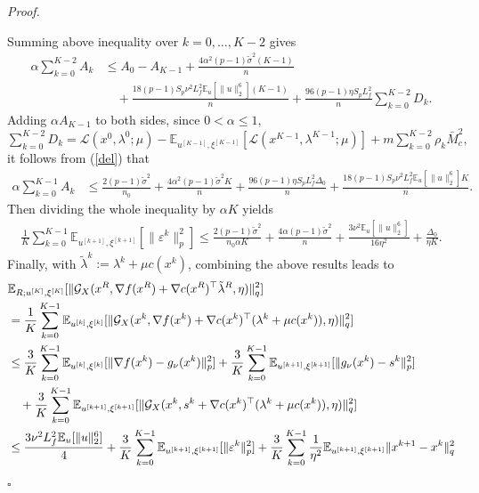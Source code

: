 \documentclass[11pt]{article}
\newenvironment{proof}[1][Proof]{%
    \par\noindent\textit{#1.}\enspace
  }{%
    \hfill\ensuremath{\square}\par
  }%
\numberwithin{equation}{section}
\newcommand{\E}{\mathbb{E}}
\newcommand{\be}{\begin{equation}}
\newcommand{\ee}{\end{equation}}
\begin{document}
\begin{proof}
\[     \]
     Summing above inequality over \(k=0,\ldots,K-2\) gives
     \begin{align*}
     \alpha\sum_{k=0}^{K-2}A_k
     &\leq A_0-A_{K-1}
     +\frac{4\alpha^2(p-1)\tilde\sigma^2(K-1)}{n}\\
     &\quad
     +\frac{18(p-1)S_p\nu^2L_f^2\E_u[\|u\|_2^6](K-1)}{n}
     +\frac{96(p-1)\eta S_pL_f^2}{n}
     \sum_{k=0}^{K-2}D_k.
     \end{align*}
     Adding \(\alpha A_{K-1}\) to both sides, since \(0<\alpha\leq1\), \(\sum_{k=0}^{K-2}D_k=\mathcal{L}(x^0,\lambda^0;\mu)
    -\E_{u^{[K-1]},\xi^{[K-1]}}[\mathcal{L}(x^{K-1},\lambda^{K-1};\mu)]
    +m \sum_{k=0}^{K-2}\rho_k \bar{M}_c^2,\) it follows from (\ref{del}) that
    \begin{align*}
         \alpha\sum_{k=0}^{K-1} A_k 
       &\leq  \frac{2(p-1)\tilde \sigma^2}{n_0}+\frac{4\alpha^2 (p -1)\tilde \sigma^2K}{n} + \frac{96 (p -1) \eta S_p L_f^2 \Delta_0}{n} 
         +\frac{18(p-1)S_p\nu^2L_f^2\E_u[\|u\|_2^6]K}{n}.
    \end{align*}
    Then dividing the whole inequality by $\alpha K$ yields 
    \be \label{evar}
    \begin{aligned}
         \frac{1}{K} \sum_{k=0}^{K-1} \E_{u^{[k+1]},\xi^{[k+1]}}[\|\varepsilon^k\|_p^2] \leq \frac{2(p-1)\tilde \sigma^2}{n_0\alpha K}+\frac{4\alpha (p -1)\tilde \sigma^2}{n} + \frac{3\nu^2\E_u[\|u\|_2^6]}{16\eta^2 } +\frac{ \Delta_0}{ \eta K}.
    \end{aligned}
    \ee
    Finally, with \(\tilde \lambda^k := \lambda^k+\mu c(x^k)\), combining the above results leads to
    \begin{align}
        & \E_{R;u^{[K]},\xi^{[K]}}  [\|\mathcal{G}_X (x^R,\nabla f(x^R) + \nabla c(x^R)^\top\tilde \lambda^R,\eta)\|_q^2 ]\notag\\
        &= \frac{1}{K} \sum_{k=0}^{K-1} \E_{u^{[k]},\xi^{[k]}} [\|\mathcal{G}_X (x^k,\nabla f(x^k) + \nabla c(x^k)^\top(\lambda^k+\mu c(x^k)),\eta)\|_q^2 ]\notag\\
        &\leq \frac{3}{K} \sum_{k=0}^{K-1} \E_{u^{[k]},\xi^{[k]}} [\|\nabla f(x^k) - g_\nu(x^k)\|_p^2 ] + \frac{3}{K} \sum_{k=0}^{K-1} \E_{u^{[k+1]},\xi^{[k+1]}} [\|g_\nu(x^k) - s^k \|_p^2 ]\notag\\
        &\quad+\frac{3}{K} \sum_{k=0}^{K-1} \E_{u^{[k+1]},\xi^{[k+1]}} [\|\mathcal{G}_X (x^k,s^k + \nabla c(x^k)^\top(\lambda^k+\mu c(x^k)),\eta)\|_q^2 ]\notag\\
        &\leq \frac{3\nu^2 L_f^2\E_u[\|u\|_2^6]}{4}+\frac{3}{K} \sum_{k=0}^{K-1} \E_{u^{[k+1]},\xi^{[k+1]}}[\|\varepsilon^k\|_p^2] +  \frac{3}{ K} \sum_{k=0}^{K-1} \frac{1}{\eta^2} \E_{u^{[k+1]},\xi^{[k+1]}} \|x^{k+1}-x^k\|_q^2 \label{eq:5.7}\\

\end{align}
\end{proof}
\end{document}
